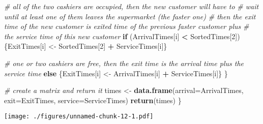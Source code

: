 \documentclass[]{article}
\newenvironment{Shaded}{\begin{snugshade}}{\end{snugshade}}
\newcommand{\CommentTok}[1]{\textcolor[rgb]{0.56,0.35,0.01}{\textit{#1}}}
\newcommand{\ControlFlowTok}[1]{\textcolor[rgb]{0.13,0.29,0.53}{\textbf{#1}}}
\newcommand{\DataTypeTok}[1]{\textcolor[rgb]{0.13,0.29,0.53}{#1}}
\newcommand{\DecValTok}[1]{\textcolor[rgb]{0.00,0.00,0.81}{#1}}
\newcommand{\FloatTok}[1]{\textcolor[rgb]{0.00,0.00,0.81}{#1}}
\newcommand{\KeywordTok}[1]{\textcolor[rgb]{0.13,0.29,0.53}{\textbf{#1}}}
\newcommand{\NormalTok}[1]{#1}
\newcommand{\OperatorTok}[1]{\textcolor[rgb]{0.81,0.36,0.00}{\textbf{#1}}}
\newcommand{\StringTok}[1]{\textcolor[rgb]{0.31,0.60,0.02}{#1}}
\begin{document}
\begin{Shaded}
\begin{Highlighting}[]
    \CommentTok{# all of the two cashiers are occupied, then the new customer will have to }
    \CommentTok{# wait until at least one of them leaves the supermarket (the faster one)}
    \CommentTok{# then the exit time of the new customer is exited time of the previous faster customer plus }
    \CommentTok{# the service time of this new customer}
    \ControlFlowTok{if}\NormalTok{ (ArrivalTimes[i] }\OperatorTok{<}\StringTok{ }\NormalTok{SortedTimes[}\DecValTok{2}\NormalTok{]) \{ExitTimes[i] <-}\StringTok{ }\NormalTok{SortedTimes[}\DecValTok{2}\NormalTok{] }\OperatorTok{+}\StringTok{ }\NormalTok{ServiceTimes[i]\}}
    
    \CommentTok{# one or two cashiers are free, then the exit time is the arrival time plus the service time}
    \ControlFlowTok{else}\NormalTok{ \{ExitTimes[i] <-}\StringTok{ }\NormalTok{ArrivalTimes[i] }\OperatorTok{+}\StringTok{ }\NormalTok{ServiceTimes[i]\}}
\NormalTok{  \}}
  
  \CommentTok{# create a matrix and return it}
\NormalTok{  times <-}\StringTok{ }\KeywordTok{data.frame}\NormalTok{(}\DataTypeTok{arrival=}\NormalTok{ArrivalTimes,}
                      \DataTypeTok{exit=}\NormalTok{ExitTimes,}
                      \DataTypeTok{service=}\NormalTok{ServiceTimes)}
  \KeywordTok{return}\NormalTok{(times)}
\NormalTok{\}}
\end{Highlighting}
\end{Shaded}

\begin{Shaded}
\end{Shaded}

\texttt{[image: ./figures/unnamed-chunk-12-1.pdf]}

\begin{Shaded}
\end{Shaded}
\end{document}
